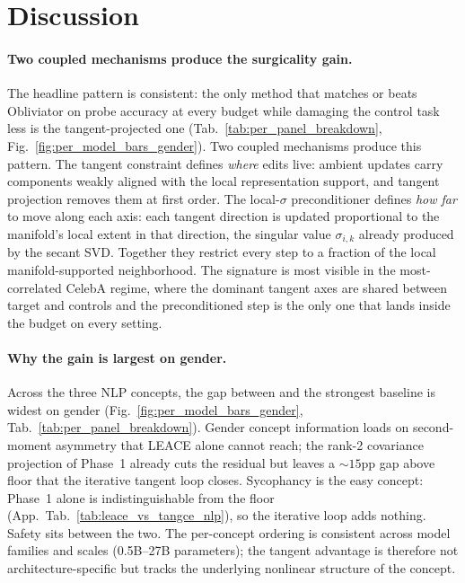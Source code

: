\section{Discussion}

\paragraph{Two coupled mechanisms produce the surgicality gain.}
The headline pattern is consistent: the only method that matches or beats Obliviator on probe accuracy at every budget while damaging the control task less is the tangent-projected one (Tab.~\ref{tab:per_panel_breakdown}, Fig.~\ref{fig:per_model_bars_gender}). Two coupled mechanisms produce this pattern. The tangent constraint defines \emph{where} edits live: ambient updates carry components weakly aligned with the local representation support, and tangent projection removes them at first order. The local-$\sigma$ preconditioner defines \emph{how far} to move along each axis: each tangent direction is updated proportional to the manifold's local extent in that direction, the singular value $\sigma_{i,k}$ already produced by the secant SVD. Together they restrict every step to a fraction of the local manifold-supported neighborhood. The signature is most visible in the most-correlated CelebA regime, where the dominant tangent axes are shared between target and controls and the preconditioned step is the only one that lands inside the budget on every setting.

\paragraph{Why the gain is largest on gender.}
Across the three NLP concepts, the gap between \TanGCEpp{} and the strongest baseline is widest on gender (Fig.~\ref{fig:per_model_bars_gender}, Tab.~\ref{tab:per_panel_breakdown}). Gender concept information loads on second-moment asymmetry that LEACE alone cannot reach; the rank-2 covariance projection of Phase~1 already cuts the residual but leaves a $\sim 15$pp gap above floor that the iterative tangent loop closes. Sycophancy is the easy concept: Phase~1 alone is indistinguishable from the floor (App.~Tab.~\ref{tab:leace_vs_tangce_nlp}), so the iterative loop adds nothing. Safety sits between the two. The per-concept ordering is consistent across model families and scales (0.5B--27B parameters); the tangent advantage is therefore not architecture-specific but tracks the underlying nonlinear structure of the concept.

